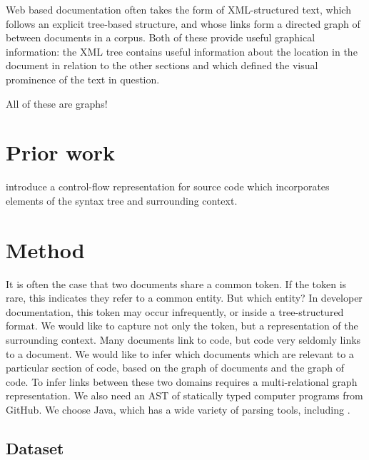 \documentclass{article}
\begin{document}
    Web based documentation often takes the form of XML-structured text, which follows an explicit tree-based structure, and whose links form a directed graph of between documents in a corpus. Both of these provide useful graphical information: the XML tree contains useful information about the location in the document in relation to the other sections and which defined the visual prominence of the text in question.

    All of these are graphs!

    \section{Prior work}

\citet{si2018learning} introduce a control-flow representation for source code which incorporates elements of the syntax tree and surrounding context.

    \section{Method}

    It is often the case that two documents share a common token. If the token is rare, this indicates they refer to a common entity. But which entity? In developer documentation, this token may occur infrequently, or inside a tree-structured format. We would like to capture not only the token, but a representation of the surrounding context. Many documents link to code, but code very seldomly links to a document. We would like to infer which documents which are relevant to a particular section of code, based on the graph of documents and the graph of code. To infer links between these two domains requires a multi-relational graph representation. We also need an AST of statically typed computer programs from GitHub. We choose Java, which has a wide variety of parsing tools, including \citet{kovalenko2019pathminer}.
    \subsection{Dataset}


\end{document}
